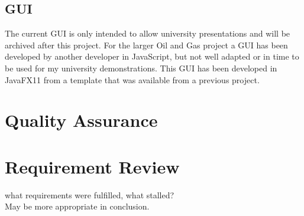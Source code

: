 \documentclass[main.tex]{subfiles}
\begin{document}
    \subsection{GUI}
      
      The current GUI is only intended to allow university presentations and will be archived after this project. For the larger Oil and Gas project a GUI has been developed by another developer in JavaScript, but not well adapted or in time to be used for my university demonstrations. This GUI has been developed in JavaFX11 from a template that was available from a previous project.
    
  \section{Quality Assurance}
     
     
      
  \section{Requirement Review}
    what requirements were fulfilled, what stalled?\\
    May be more appropriate in conclusion.
  
\end{document}
